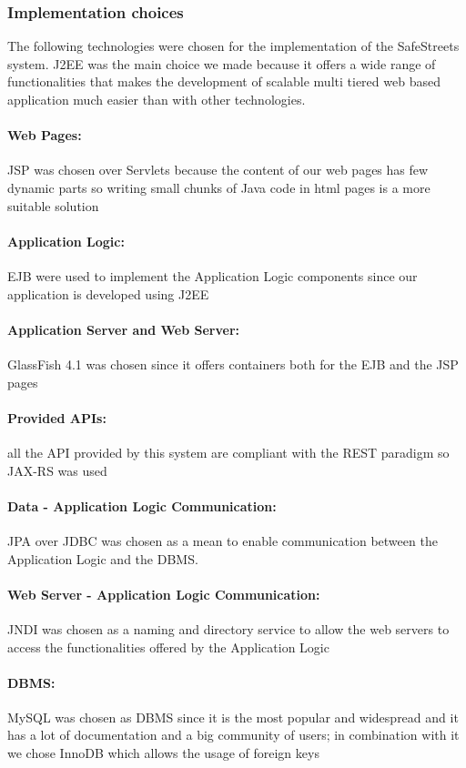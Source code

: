 \subsubsection{Implementation choices}
The following technologies were chosen for the implementation of the SafeStreets system. J2EE was the main choice we made because it offers a wide range of functionalities that makes the development of scalable multi tiered web based application much easier than with other technologies.

\paragraph{Web Pages:} JSP was chosen over Servlets because the content of our web pages has few dynamic parts so writing small chunks of Java code in html pages is a more suitable solution
\paragraph{Application Logic:} EJB were used to implement the Application Logic components since our application is developed using J2EE
\paragraph{Application Server and Web Server:} GlassFish 4.1 was chosen since it offers containers both for the EJB and the JSP pages 
\paragraph{Provided APIs:} all the API provided by this system are compliant with the REST paradigm so JAX-RS was used
\paragraph{Data - Application Logic Communication:} JPA over JDBC was chosen as a mean to enable communication between the Application Logic and the DBMS.

\paragraph{Web Server - Application Logic Communication:} JNDI was chosen as a naming and directory service to allow the web servers to access the functionalities offered by the Application Logic
\paragraph{DBMS:} MySQL was chosen as DBMS since it is the most popular and widespread and it has a lot of documentation and a big community of users; in combination with it we chose InnoDB which allows the usage of foreign keys
\clearpage
